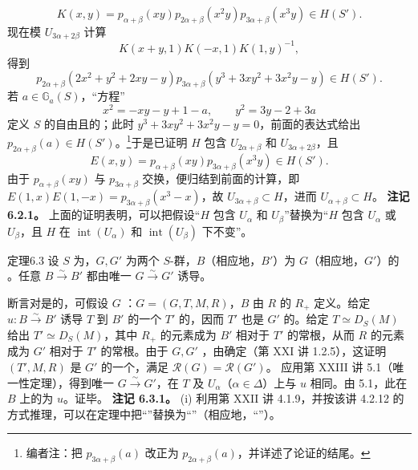 \[K(x,y)=p_{\alpha+\beta}(xy)p_{2\alpha+\beta}(x^2y)p_{3\alpha+\beta}(x^3y)\in H(S').\]
现在模 $U_{3\alpha+2\beta}$ 计算
\[K(x+y,1)K(-x,1)K(1,y)^{-1},\]
得到
\[p_{2\alpha+\beta}(2x^2+y^2+2xy-y)p_{3\alpha+\beta}(y^3+3xy^2+3x^2y-y)\in H(S').\]
若 $a\in\mathbb G_a(S)$，“方程”
\[x^2=-xy-y+1-a,\qquad y^2=3y-2+3a\]
定义 $S$ 的自由且的；此时 $y^3+3xy^2+3x^2y-y=0$，前面的表达式给出 $p_{2\alpha+\beta}(a)\in H(S')$。\footnote{编者注：把 $p_{3\alpha+\beta}(a)$ 改正为 $p_{2\alpha+\beta}(a)$，并详述了论证的结尾。}于是已证明 $H$ 包含 $U_{2\alpha+\beta}$ 和 $U_{3\alpha+2\beta}$，且
\[E(x,y)=p_{\alpha+\beta}(xy)p_{3\alpha+\beta}(x^3y)\in H(S').\]
由于 $p_{\alpha+\beta}(xy)$ 与 $p_{3\alpha+\beta}$ 交换，便归结到前面的计算，即 $E(1,x)E(1,-x)=p_{3\alpha+\beta}(x^3-x)$，故 $U_{3\alpha+\beta}\subset H$，进而 $U_{\alpha+\beta}\subset H$。
\textbf{注记 6.2.1。} 上面的证明表明，可以把假设“$H$ 包含 $U_\alpha$ 和 $U_\beta$”替换为“$H$ 包含 $U_\alpha$ 或 $U_\beta$，且 $H$ 在 $\operatorname{int}(U_\alpha)$ 和 $\operatorname{int}(U_\beta)$ 下不变”。

\begin{SGAresult}{定理}{6.3}
设 $S$ 为，$G,G'$ 为两个 $S$-群，$B$（相应地，$B'$）为 $G$（相应地，$G'$）的 。任意 $B\xrightarrow{\sim}B'$ 都由唯一 $G\xrightarrow{\sim}G'$ 诱导。
\end{SGAresult}
断言对是的，可假设 $G$ ：$G=(G,T,M,R)$，$B$ 由 $R$ 的 $R_+$ 定义。给定 $u:B\xrightarrow{\sim}B'$ 诱导 $T$ 到 $B'$ 的一个 $T'$ 的，因而 $T'$ 也是 $G'$ 的。给定 $T\simeq D_S(M)$ 给出 $T'\simeq D_S(M)$，其中 $R_+$ 的元素成为 $B'$ 相对于 $T'$ 的常根，从而 $R$ 的元素成为 $G'$ 相对于 $T'$ 的常根。由于 $G,G'$ ，由确定（第 XXI 讲 1.2.5），这证明 $(T',M,R)$ 是 $G'$ 的一个，满足 $\mathscr R(G)=\mathscr R(G')$。
应用第 XXIII 讲 5.1（唯一性定理），得到唯一 $G\xrightarrow{\sim}G'$，在 $T$ 及 $U_\alpha$（$\alpha\in\Delta$）上与 $u$ 相同。由 5.1，此在 $B$ 上的为 $u$。证毕。
\textbf{注记 6.3.1。} (i) 利用第 XXII 讲 4.1.9，并按该讲 4.2.12 的方式推理，可以在定理中把“”替换为“”（相应地，“”）。

